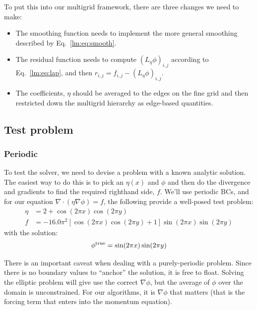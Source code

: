 To put this into our multigrid framework, there are three changes we
need to make:
\begin{itemize}
\item The smoothing function needs to implement the more general smoothing
described by Eq.~\ref{lm:eq:smooth}.

\item The residual function needs to compute $(L_\eta \phi)_{i,j}$ according
to Eq.~\ref{lm:eq:lap}, and then $r_{i,j} = f_{i,j} - (L_\eta \phi)_{i,j}$.

\item The coefficients, $\eta$ should be averaged to the edges on the fine
grid and then restricted down the multigrid hierarchy as edge-based 
quantities.
\end{itemize}

\subsection{Test problem}

\subsubsection{Periodic}

To test the solver, we need to devise a problem with a known analytic
solution.  The easiest way to do this is to pick an $\eta(x)$ and
$\phi$ and then do the divergence and gradients to find the required
righthand side, $f$.  We'll use periodic BCs, and for our
equation $\nabla \cdot ( \eta \nabla \phi ) = f$, the following
provide a well-posed test problem:
\begin{align}
\eta &= 2 + \cos(2\pi x) \cos(2\pi y)  \label{eq:vc:lap}
\\
f &= -16.0 \pi^2 \left [ \cos(2\pi x)\cos(2\pi y) + 1 \right ] \sin(2\pi x)\sin(2 \pi y) \nonumber
\end{align}
with the solution:
\begin{equation}
\phi^\mathrm{true} = \sin(2 \pi x) \sin(2\pi y) \nonumber \\
\end{equation}

There is an important caveat when dealing with a purely-periodic
problem.  Since there is no boundary values to ``anchor'' the solution,
it is free to float.  Solving the elliptic problem will give use the
correct $\nabla \phi$, but the average of $\phi$ over the domain is 
unconstrained.  For our algorithms, it is $\nabla \phi$ that matters
(that is the forcing term that enters into the momentum equation).

